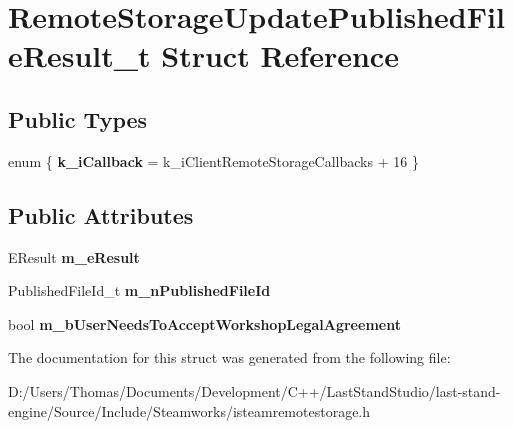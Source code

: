 \hypertarget{structRemoteStorageUpdatePublishedFileResult__t}{}\section{Remote\+Storage\+Update\+Published\+File\+Result\+\_\+t Struct Reference}
\label{structRemoteStorageUpdatePublishedFileResult__t}
\subsection*{Public Types}
\begin{DoxyCompactItemize}
\item 
\hypertarget{structRemoteStorageUpdatePublishedFileResult__t_a28887776994b263a928e00766fd4b5ce}{}enum \{ {\bfseries k\+\_\+i\+Callback} = k\+\_\+i\+Client\+Remote\+Storage\+Callbacks + 16
 \}\label{structRemoteStorageUpdatePublishedFileResult__t_a28887776994b263a928e00766fd4b5ce}

\end{DoxyCompactItemize}
\subsection*{Public Attributes}
\begin{DoxyCompactItemize}
\item 
\hypertarget{structRemoteStorageUpdatePublishedFileResult__t_a37d9e5b614b505e710f2e4ddc240cf03}{}E\+Result {\bfseries m\+\_\+e\+Result}\label{structRemoteStorageUpdatePublishedFileResult__t_a37d9e5b614b505e710f2e4ddc240cf03}

\item 
\hypertarget{structRemoteStorageUpdatePublishedFileResult__t_a600fc1c90c666735b24749ee2e5754a8}{}Published\+File\+Id\+\_\+t {\bfseries m\+\_\+n\+Published\+File\+Id}\label{structRemoteStorageUpdatePublishedFileResult__t_a600fc1c90c666735b24749ee2e5754a8}

\item 
\hypertarget{structRemoteStorageUpdatePublishedFileResult__t_afdd0c3432455581dfa122b5e1926e72b}{}bool {\bfseries m\+\_\+b\+User\+Needs\+To\+Accept\+Workshop\+Legal\+Agreement}\label{structRemoteStorageUpdatePublishedFileResult__t_afdd0c3432455581dfa122b5e1926e72b}

\end{DoxyCompactItemize}


The documentation for this struct was generated from the following file\+:\begin{DoxyCompactItemize}
\item 
D\+:/\+Users/\+Thomas/\+Documents/\+Development/\+C++/\+Last\+Stand\+Studio/last-\/stand-\/engine/\+Source/\+Include/\+Steamworks/isteamremotestorage.\+h\end{DoxyCompactItemize}
